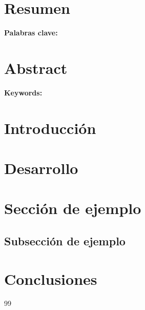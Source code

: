 \documentclass[12pt,a4paper]{article}
\begin{document}
	
	\ReportCover
	
	\onehalfspacing %
	
	\section*{Resumen}
		
	\vspace{0.5cm}
	\noindent\textbf{Palabras clave:} 
	
	\newpage
	
	\section*{Abstract}
	
	\vspace{0.5cm}
	\noindent\textbf{Keywords:} 
	
	\newpage
	
	\tableofcontents
	\newpage
	
	\newpage
	\section*{Introducción}
	\newpage
	\section*{Desarrollo}
	\section {Sección de ejemplo}
	
	\subsection{Subsección de ejemplo}
	\newpage
	\section*{Conclusiones}
	
	\newpage
	
	\begin{thebibliography}{99}
		

		
		
	\end{thebibliography}
	
\end{document}
